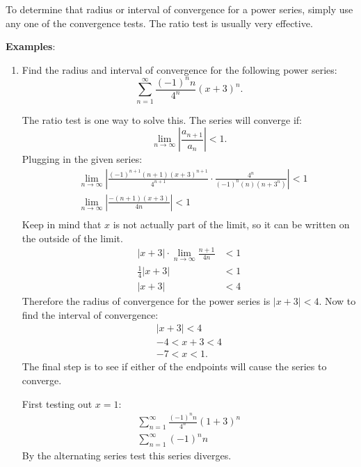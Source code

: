 \documentclass[12pt]{article}
\begin{document}
To determine that radius or interval of convergence for a power series, simply use any one of the convergence tests. The ratio test is usually very effective.

\noindent \textbf{Examples}:
\begin{enumerate}
    \item Find the radius and interval of convergence for the following power series:
          \[ \sum_{n=1}^\infty \frac{(-1)^n n}{4^n} (x+3)^n. \]

          The ratio test is one way to solve this. The series will converge if:
          \[ \lim_{n \to \infty} \left| \frac{a_{n+1}}{a_n} \right| < 1. \]
          Plugging in the given series:
          \begin{align*}
               & \lim_{n \to \infty} \left| \frac{(-1)^{n+1}(n+1)(x+3)^{n+1}}{4^{n+1}} \cdot \frac{4^n}{(-1)^n (n)(n+3^n)} \right| < 1 \\[6pt]
               & \lim_{n \to \infty} \left| \frac{-(n+1)(x+3)}{4n} \right| < 1                                                         \\[6pt]
          \end{align*}
          Keep in mind that $x$ is not actually part of the limit, so it can be written on the outside of the limit.
          \begin{align*}
              |x+3| \cdot \lim_{n \to \infty} \frac{n+1}{4n} & < 1 \\[6pt]
              \frac{1}{4} |x+3|                              & < 1 \\[6pt]
              |x+3|                                          & < 4
          \end{align*}
          Therefore the radius of convergence for the power series is $|x+3| < 4$. Now to find the interval of convergence:
          \begin{gather*}
              |x+3| < 4 \\
              -4 < x+3 < 4 \\
              -7 < x < 1.
          \end{gather*}
          The final step is to see if either of the endpoints will cause the series to converge.

          First testing out $x=1$:
          \begin{gather*}
              \sum_{n=1}^\infty \frac{(-1)^n n}{4^n} (1+3)^n \\[6pt]
              \sum_{n=1}^\infty (-1)^n n
          \end{gather*}
          By the alternating series test this series diverges.


\end{enumerate}
\end{document}
